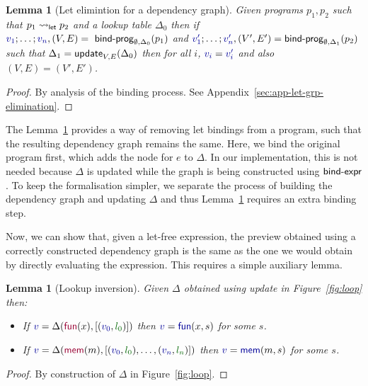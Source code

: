 \documentclass[english,crc]{programming}
\newcounter{thc}
\theoremstyle{plain}
\newtheorem{lem}[thc]{Lemma}
\theoremstyle{definition}
\newcommand{\ident}[1]{\textnormal{\textcolor{idclr}{\sffamily #1}}}
\newcommand{\bndclr}[1]{\textcolor{kvdclr}{#1}}
\newcommand{\blblclr}[1]{\textcolor{numclr}{#1}}
\newcommand{\bnd}[1]{\textnormal{\textcolor{kvdclr}{\sffamily #1}}}
\newcommand{\bknd}[1]{\textnormal{\textcolor{prepclr}{\sffamily #1}}}
\begin{document}
\begin{lem}[Let elimintion for a dependency graph]
\label{thm:let-grp-elimination}
Given programs $p_1, p_2$ such that $p_1 \rightsquigarrow_\ident{let} p_2$ and a lookup table
$\Delta_0$ then if $\bndclr{v_1}; \ldots; \bndclr{v_n}, (V, E) = \ident{bind-prog}_{\emptyset, \Delta_0}(p_1)$ and
$\bndclr{v'_1};\ldots;\bndclr{v'_n}, (V', E') = \ident{bind-prog}_{\emptyset, \Delta_1}(p_2)$ such that $\Delta_1 = \ident{update}_{V, E}(\Delta_0)$
then for all $i$, $\bndclr{v_i} = \bndclr{v'_i}$ and also $(V, E) = (V', E')$.
\end{lem}
\begin{proof}
By analysis of the binding process. See Appendix~\ref{sec:app-let-grp-elimination}.
\end{proof}

\noindent
The Lemma~\ref{thm:let-grp-elimination} provides a way of removing let bindings from a program,
such that the resulting dependency graph remains the same. Here, we bind the original program
first, which adds the node for $e$ to $\Delta$. In our implementation, this is not needed
because $\Delta$ is updated while the graph is being constructed using $\ident{bind-expr}$.
To keep the formalisation simpler, we separate the process of building the dependency graph
and updating $\Delta$ and thus Lemma~\ref{thm:let-grp-elimination} requires an extra binding step.

Now, we can show that, given a let-free expression, the preview obtained using a correctly
constructed dependency graph is the same as the one we would obtain by directly evaluating the
expression. This requires a simple auxiliary lemma.

\begin{lem}[Lookup inversion]
\label{thm:lemma-lookup}
Given $\Delta$ obtained using \ident{update} in Figure~\ref{fig:loop} then:
\begin{itemize}
\raggedright
\item[--] If $\bndclr{v}=\Delta(\bknd{fun}(x),[(\bndclr{v_0}, \blblclr{l_0})])$
then $\bndclr{v}=\bnd{fun}(x, s)$ for some $s$.
\item[--] If $\bndclr{v}=\Delta(\bknd{mem}(m),[(\bndclr{v_0}, \blblclr{l_0}), \ldots, (\bndclr{v_n}, \blblclr{l_n})])$
then $\bndclr{v}=\bnd{mem}(m, s)$ for some $s$.
\end{itemize}
\end{lem}
\begin{proof}
By construction of $\Delta$ in Figure~\ref{fig:loop}.
\end{proof}
\end{document}
